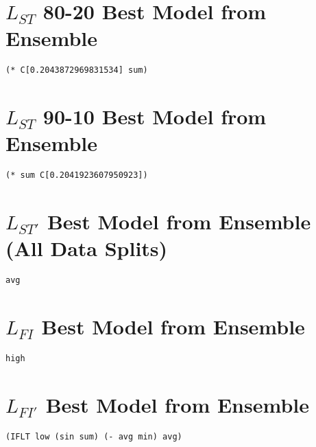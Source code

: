 \documentclass[12pt, letterpaper]{article}
\begin{document}
\begin{appendices}
\section{$L_{ST}$ 80-20 Best Model from Ensemble}
\label{appendix-d}
\begin{lstlisting}
(* C[0.2043872969831534] sum)
\end{lstlisting}

\section{$L_{ST}$ 90-10 Best Model from Ensemble}
\label{appendix-e}
\begin{lstlisting}
(* sum C[0.2041923607950923])
\end{lstlisting}

\section{$L_{ST'}$ Best Model from Ensemble (All Data Splits)}
\label{appendix-f}
\begin{lstlisting}
avg
\end{lstlisting}

\section{$L_{FI}$ Best Model from Ensemble}
\label{appendix-g}
\begin{lstlisting}
high
\end{lstlisting}

\section{$L_{FI'}$ Best Model from Ensemble}
\label{appendix-h}
\begin{lstlisting}
(IFLT low (sin sum) (- avg min) avg)
\end{lstlisting}

\end{appendices}

\newpage



\end{document}
